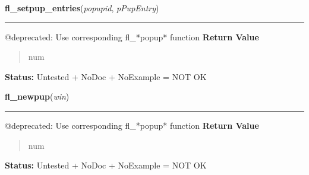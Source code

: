     \label{xformslib:deprecated:fl_setpup_entries}

    \vspace{0.5ex}

\hspace{.8\funcindent}\begin{boxedminipage}{\funcwidth}

    \raggedright \textbf{fl\_setpup\_entries}(\textit{popupid}, \textit{pPupEntry})

    \vspace{-1.5ex}

    \rule{\textwidth}{0.5\fboxrule}
\setlength{\parskip}{2ex}

@deprecated: Use corresponding fl\_*popup* function
\setlength{\parskip}{1ex}
      \textbf{Return Value}
    \vspace{-1ex}

      \begin{quote}

num
      \end{quote}

\textbf{Status:} 
Untested + NoDoc + NoExample = NOT OK


    \end{boxedminipage}

    \label{xformslib:deprecated:fl_newpup}

    \vspace{0.5ex}

\hspace{.8\funcindent}\begin{boxedminipage}{\funcwidth}

    \raggedright \textbf{fl\_newpup}(\textit{win})

    \vspace{-1.5ex}

    \rule{\textwidth}{0.5\fboxrule}
\setlength{\parskip}{2ex}

@deprecated: Use corresponding fl\_*popup* function
\setlength{\parskip}{1ex}
      \textbf{Return Value}
    \vspace{-1ex}

      \begin{quote}

num
      \end{quote}

\textbf{Status:} 
Untested + NoDoc + NoExample = NOT OK


    \end{boxedminipage}

